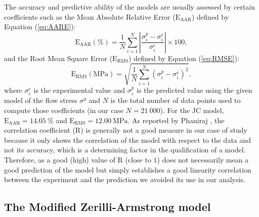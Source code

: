 \documentclass[twoside,english,1p,final,sort&compress]{elsarticle}
\theoremstyle{plain}
\DeclareRobustCommand{\RMSE}{\text{E}_\text{RMS}}
\DeclareRobustCommand{\AARE}{\text{E}_\text{AAR}}
\DeclareRobustCommand{\R}{\text{R}}
\begin{document}
The accuracy and predictive ability of the models are usually assessed by certain coefficients such as the Mean Absolute Relative Error ($\AARE$) defined by Equation (\ref{eq:AARE}):
\begin{equation}
\AARE(\%) = \frac{1}{N} \sum_{i=1}^{N}{\left|\frac{\sigma_i^p -\sigma_i^e}{\sigma_i^e}\right|} \times 100, \label{eq:AARE}
\end{equation}
and the Root Mean Square Error ($\RMSE$) defined by Equation (\ref{eq:RMSE}):
\begin{equation}
\RMSE (\text{MPa}) = \sqrt{\frac{1}{N} \sum_{i=1}^{N} \left(\sigma_i^p - \sigma_i^e\right)^2}, \label{eq:RMSE}
\end{equation}
where $\sigma_i^e$ is the experimental value and $\sigma_i^p$ is the predicted value using the given model of the flow stress $\sigma^y$ and $N$ is the total number of data points used to compute those coefficients (in our case $N=21~000$).
For the JC model, $\AARE=14.05~\%$ and $\RMSE=12.00~\text{MPa}$.
As reported by Phaniraj \cite{Phaniraj-2003}, the correlation coefficient ($\R$) is generally not a good measure in our case of study because it only shows the correlation of the model with respect to the data and not its accuracy, which is a determining factor in the qualification of a model.
Therefore, as a good (high) value of $\R$ (close to $1$) does not necessarily mean a good prediction of the model but simply establishes a good linearity correlation between the experiment and the prediction we avoided its use in our analysis.

\subsection{The Modified Zerilli-Armstrong model\label{sec:MZA}}
\end{document}
